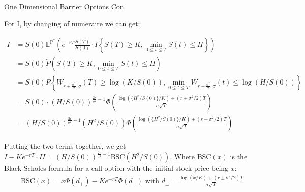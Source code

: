 \documentclass{beamer}
\begin{document}
\begin{frame}{One Dimensional Barrier Options Con.}
    
    {\footnotesize \footnotesize
    \par For I, by changing of numeraire we can get:
    \vspace{-0.5em}
    {\footnotesize \scriptsize
    \begin{align*}
    I &= S(0) \mathbb{E}^{\mathbb{P}^*} \left( e^{-rT} \frac{S(T)}{S(0)} \cdot I\left\{S(T) \geq K, \min_{0 \leq t \leq T} S(t) \leq H\right\} \right) \\
    &= S(0) \tilde{P}\left(S(T) \geq K, \min_{0 \leq t \leq T} S(t) \leq H\right) \\
    &= S(0) P\left\{W_{r+\frac{\sigma^2}{2}, \sigma}(T) \geq \log(K/S(0)), \min_{0 \leq t \leq T} W_{r+\frac{\sigma^2}{2}, \sigma}(t) \leq \log(H/S(0))\right\} \\
    &= S(0) \cdot (H/S(0))^{\frac{2r}{\sigma^2}+1} \Phi \left( \frac{\log(\{H^2/S(0)\}/K)+(r+\sigma^2/2)T}{\sigma\sqrt{T}} \right) \\
    &= (H/S(0))^{\frac{2r}{\sigma^2}-1}(H^2/S(0)) \Phi \left( \frac{\log(\{H^2/S(0)\}/K)+(r+\sigma^2/2)T}{\sigma\sqrt{T}} \right)
    \end{align*}
    \par Putting the two terms together, we get $I - Ke^{-rT} \cdot II = (H/S(0))^{\frac{2r}{\sigma^2}-1} \text{BSC}(H^2/S(0))$. 
    Where \(\text{BSC}(x)\) is the Black-Scholes formula for a call option with the initial stock price being \(x\):
    \begin{align*}
        \text{BSC}(x) = x\Phi(d_+) - Ke^{-rT}\Phi(d_-) \text{ with } d_{\pm} = \frac{\log(x/K)+(r\pm\sigma^2/2)T}{\sigma\sqrt{T}}
    \end{align*}
    \vspace{-1em}
    }
    }
\end{frame}
\end{document}
